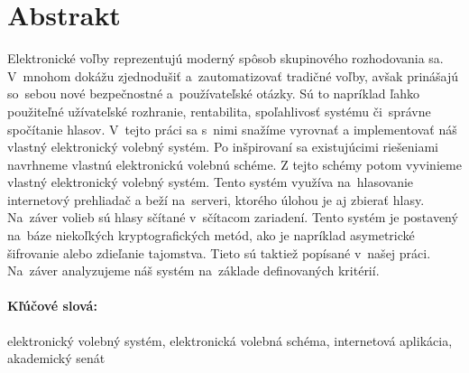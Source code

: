 \documentclass[12pt, oneside]{book}
\begin{document}
\newpage 
\section*{Abstrakt}


Elektronické voľby reprezentujú moderný spôsob skupinového rozhodovania sa. V~mnohom dokážu zjednodušiť a~zautomatizovať tradičné voľby, avšak prinášajú so~sebou nové bezpečnostné a~používateľské otázky. Sú to napríklad ľahko použiteľné užívateľské rozhranie, rentabilita, spoľahlivosť systému či~správne spočítanie hlasov. V~tejto práci sa s~nimi snažíme vyrovnať a implementovať náš vlastný elektronický volebný systém. Po inšpirovaní sa existujúcimi riešeniami navrhneme vlastnú elektronickú volebnú schéme. Z tejto schémy potom vyvinieme vlastný elektronický volebný systém. Tento systém využíva na~hlasovanie internetový prehliadač a beží na~serveri, ktorého úlohou je aj zbierať hlasy. Na~záver volieb sú hlasy sčítané v~sčítacom zariadení. Tento systém je postavený na~báze niekoľkých kryptografických metód, ako je napríklad asymetrické šifrovanie alebo zdieľanie tajomstva. Tieto sú taktiež popísané v~našej práci. Na~záver analyzujeme náš systém na~základe definovaných kritérií.

\paragraph*{Kľúčové slová:} elektronický volebný systém, elektronická volebná schéma, internetová aplikácia, akademický senát



%
%


\end{document}
